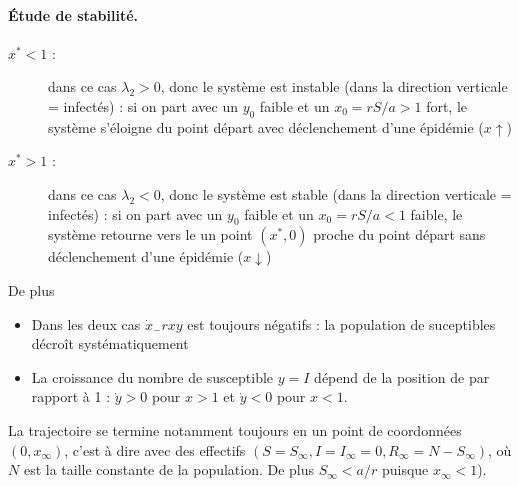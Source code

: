 \paragraph*{\'Etude de stabilité.}
\begin{description}
  \item[$x^* < 1$ :] dans ce cas $\lambda_2 > 0$, donc le système est instable (dans la direction verticale = infectés) : si on part avec un $y_0$ faible et un $x_0 = rS/a > 1$ fort, le système s'éloigne du point départ avec déclenchement d'une épidémie ($x \uparrow$)
  \item[$x^* > 1$ :] dans ce cas $\lambda_2 < 0$, donc le système est stable (dans la direction verticale = infectés) : si on part avec un $y_0$ faible et un $x_0 = rS/a < 1$ faible, le système retourne vers le un point $(x^*, 0)$ proche du point départ sans déclenchement d'une épidémie ($x \downarrow$)
\end{description}


De plus
\begin{itemize}
  \item Dans les deux cas $\dot x _ -rxy$ est toujours négatifs : la population de suceptibles décroît systématiquement
  \item La croissance du nombre de susceptible $y = I$ dépend de la position de par rapport à 1 : $\dot y > 0$ pour $x > 1$ et $\dot y < 0$ pour $x < 1$.
\end{itemize}
La trajectoire se termine notamment toujours en un point de coordonnées $(0, x_\infty)$, c'est à dire avec des effectifs $(S = S_\infty, I = I_\infty = 0, R_\infty = N - S_\infty)$, où $N$ est la taille constante de la population. De plus $S_\infty < a/r$ puisque $x_\infty < 1$).


